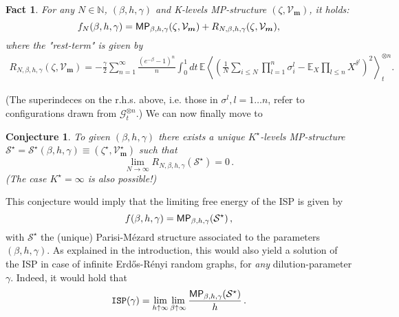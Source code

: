 \documentclass[a4paper,12pt,oneside,reqno]{amsart}
\numberwithin{equation}{section}
\newtheorem{fact}{Fact}
\newtheorem{conj}[teor]{Conjecture}
\begin{document}
\begin{fact} \label{interpolation} For any $N\in {\mathbb{N}}$, $({\beta}, h, \gamma)$ and K-levels MP-structure $(\zeta, \mathcal V_{\boldsymbol m})$, it holds: 
\begin{equation} \label{free_lowtemp}
f_N({\beta}, h, \gamma) = \text{\sf{MP}}_{{\beta}, h, \gamma}(\zeta,  \mathcal V_{\boldsymbol m})  + R_{N, {\beta}, h, \gamma}(\zeta, \mathcal V_{\boldsymbol m}), 
\end{equation}
where the "rest-term" is given by
\begin{equation} \label{restterm_hell} \begin{aligned} 
R_{N, {\beta}, h, \gamma}(\zeta, \mathcal V_{\boldsymbol m}) = -\frac{\gamma}{2}\sum\limits_{n=1}^{\infty} \frac{\left(e^{-\beta}-1\right)^n}{n} \int_0^1 dt \, {{\mathbb{E}}} \left<\left(\frac{1}{N}\sum\limits_{i\leq N}\prod\limits_{l=1}^n \sigma^l_i- {{\mathbb{E}}}_X\prod\limits_{l\leq n}X^{\delta^l}\right)^2 \right>^{\otimes n}_t.
\end{aligned} \end{equation}
\end{fact}
(The superindeces on the r.h.s. above, i.e. those in ${\sigma}^l, l = 1 \dots n$, refer to configurations drawn from $\mathcal G_t^{\otimes n}$.) We can now finally move to 

\begin{conj} \label{conj_hell} To given $({\beta}, h, \gamma)$ there exists a unique $K^\star$-levels MP-structure $
\mathcal S^\star = \mathcal S^\star({\beta}, h, \gamma) {\equiv} (\zeta^\star, \mathcal V^\star_{\boldsymbol m})$ such that 
\[
\lim_{N\to \infty} R_{N, {\beta}, h, \gamma}(\mathcal S^\star) = 0\,.
\]
(The case $K^\star= \infty$ is also possible!)
\end{conj}
\noindent This conjecture would imply that the limiting free energy of the ISP is given by 
\[
f({\beta}, h, \gamma) = \text{\sf{MP}}_{{\beta}, h, \gamma}(\mathcal S^\star)\,,
\]
with $\mathcal S^\star$ the (unique) Parisi-M\'{e}zard structure associated to the parameters $({\beta}, h, \gamma)$. As explained in the introduction, this would also yield a solution of the ISP in case of infinite Erd\H{o}s-R\'{e}nyi random graphs, for {\it any} dilution-parameter $\gamma$. Indeed, it would hold that 
\[
\texttt{ISP}(\gamma) = \lim_{h \uparrow \infty} \lim_{{\beta} \uparrow \infty} \frac{\text{\sf{MP}}_{{\beta}, h, \gamma}(\mathcal S^\star)}{h}\,.
\]
\end{document}
